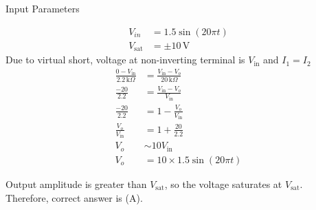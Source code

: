 \documentclass[journal,12pt,twocolumn]{IEEEtran}
\begin{document}
\begin{table}[htbp]
  \centering
  
  \caption{Input Parameters}
  \label{tab:PH.11.table1}
\end{table}
\begin{align}
V_{in} &= 1.5 \sin(20\pi t)\\
V_{\text{sat}} &= \pm 10 \, \text{V}
\end{align}
Due to virtual short, voltage at non-inverting terminal is \( V_{\text{in}} \) and $I_1 = I_2$\\
\begin{align}
\frac{0 - V_{\text{in}}}{2.2 \, \text{k}\Omega} &= \frac{V_{\text{in}} - V_o}{20 \, \text{k}\Omega}\\
\frac{-20}{2.2} &= \frac{V_{\text{in}} - V_o}{V_{\text{in}}}\\
\frac{-20}{2.2} &= 1 - \frac{V_o}{V_{\text{in}}}\\
\frac{V_o}{V_{\text{in}}} &= 1 + \frac{20}{2.2}\\
V_o &\sim 10 V_{\text{in}}\\
V_o &= 10 \times 1.5 \sin(20\pi t)
\end{align}

Output amplitude is greater than $V_{\text{sat}}$, so the voltage saturates at $V_{\text{sat}}$.\\
Therefore, correct answer is (A).
\end{document}
